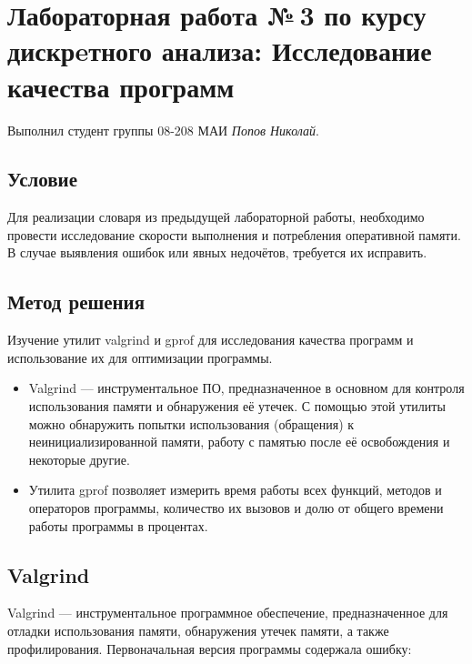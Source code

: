 \documentclass[12pt]{article}
\begin{document}
\section*{Лабораторная работа №\,3 по курсу дискрeтного анализа: Исследование качества программ}

Выполнил студент группы 08-208 МАИ \textit{Попов Николай}.

\subsection*{Условие}

Для реализации словаря из предыдущей лабораторной работы, необходимо провести
исследование скорости выполнения и потребления оперативной памяти.
В случае выявления ошибок или явных недочётов, требуется их исправить.


\subsection*{Метод решения}

Изучение утилит valgrind и gprof для исследования качества программ и использование
их для оптимизации программы.

\begin{itemize}
    \item Valgrind — инструментальное ПО, предназначенное в основном для контроля использования памяти и обнаружения её утечек. С помощью этой утилиты можно обнаружить попытки использования (обращения) к неинициализированной памяти, работу с памятью после её освобождения и некоторые другие.
    \item Утилита gprof позволяет измерить время работы всех функций, методов и операторов программы, количество их вызовов и долю от общего времени работы программы в процентах.
\end{itemize}



\subsection*{Valgrind}

Valgrind — инструментальное программное обеспечение, предназначенное для отладки
использования памяти, обнаружения утечек памяти, а также профилирования.
Первоначальная версия программы содержала ошибку:
\end{document}
